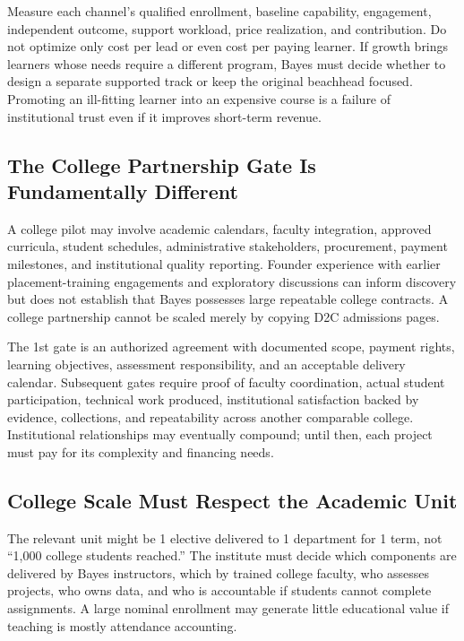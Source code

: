 Measure each channel's qualified enrollment, baseline capability, engagement, independent outcome, support workload, price realization, and contribution. Do not optimize only cost per lead or even cost per paying learner. If growth brings learners whose needs require a different program, Bayes must decide whether to design a separate supported track or keep the original beachhead focused. Promoting an ill-fitting learner into an expensive course is a failure of institutional trust even if it improves short-term revenue.

\subsection{The College Partnership Gate Is Fundamentally Different}
\label{sec:college_partnership_gate}

A college pilot may involve academic calendars, faculty integration, approved curricula, student schedules, administrative stakeholders, procurement, payment milestones, and institutional quality reporting. Founder experience with earlier placement-training engagements and exploratory discussions can inform discovery but does not establish that Bayes possesses large repeatable college contracts. A college partnership cannot be scaled merely by copying D2C admissions pages.

The 1st gate is an authorized agreement with documented scope, payment rights, learning objectives, assessment responsibility, and an acceptable delivery calendar. Subsequent gates require proof of faculty coordination, actual student participation, technical work produced, institutional satisfaction backed by evidence, collections, and repeatability across another comparable college. Institutional relationships may eventually compound; until then, each project must pay for its complexity and financing needs.

\subsection{College Scale Must Respect the Academic Unit}
\label{sec:college_scale_respect_academic_unit}

The relevant unit might be 1 elective delivered to 1 department for 1 term, not ``1,000 college students reached.'' The institute must decide which components are delivered by Bayes instructors, which by trained college faculty, who assesses projects, who owns data, and who is accountable if students cannot complete assignments. A large nominal enrollment may generate little educational value if teaching is mostly attendance accounting.

